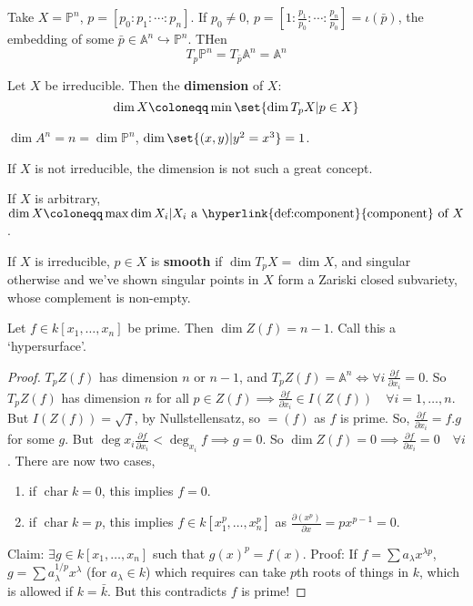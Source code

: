 \documentclass{article}
\newcommand{\A}{\mathbb{A}}
\newcommand{\proj}{\mathbb{P}}
\DeclareMathOperator{\chara}{char}
\begin{document}
\begin{eg}
    Take $X = \proj^n$, $p = [p_0: p_1: \dotsb: p_n]$. If $p_0 \neq 0$, $p = [1: \frac{p_1}{p_0} : \dotsb : \frac{p_n}{p_0}] = \iota(\bar{p})$, the embedding of some $\bar{p} \in \A^n \hookrightarrow \proj^n$. THen
    \begin{equation*}
        T_p \proj^n = T_{\bar{p}} \A^n = \A^n
    \end{equation*}
\end{eg}
\begin{defi}
    Let $X$ be irreducible. Then the \textbf{dimension} of $X$:
    \begin{equation*}
        \dim X \coloneqq \min \set{\dim T_p X | p \in X}
    \end{equation*}
\end{defi}
\begin{eg}
    $\dim A^n = n = \dim \proj^n$, $\dim \set{(x, y) | y^2 = x^3} = 1$.
\end{eg}
If $X$ is not irreducible, the dimension is not such a great concept.
\begin{defi}
    If $X$ is arbitrary, $\dim X \coloneqq \max{\dim X_i | X_i \text{ a \hyperlink{def:component}{component} of } X}$.
\end{defi}
\begin{defi}
    If $X$ is irreducible, $p \in X$ is \textbf{smooth} if $\dim T_p X = \dim X$, and singular otherwise and we've shown singular points in $X$ form a Zariski closed subvariety, whose complement is non-empty. %
\end{defi}
\begin{lemma}
    Let $f \in k[x_1, \dotsc, x_n]$ be prime. Then $\dim Z(f) = n-1$. Call this a `hypersurface'.
\end{lemma}
\begin{proof}
    $T_p Z(f)$ has dimension $n$ or $n-1$, and $T_p Z(f) = \A^n \iff \forall i \, \frac{\partial f}{\partial x_i} = 0$.
    So $T_p Z(f)$ has dimension $n$ for all $p \in Z(f) \implies \frac{\partial f}{\partial x_i} \in I(Z(f)) \quad \forall i=1, \dotsc, n$.
    But $I(Z(f)) = \sqrt{f}$, by Nullstellensatz, so $=(f)$ as $f$ is prime.
    So, $\frac{\partial f}{\partial x_i} = f . g$ for some $g$. But $\deg x_i \frac{\partial f}{\partial x_i} < \deg_{x_i} f \implies g = 0$.
    So $\dim Z(f) = 0 \implies \frac{\partial f}{\partial x_i} = 0 \quad \forall i$.
    There are now two cases,
    \begin{enumerate}[label=(\roman*)]
        \item if $\chara k = 0$, this implies $f = 0$.
        \item if $\chara k = p$, this implies $f \in k[x_1^p, \dotsc, x_n^p]$ as $\frac{\partial (x^p)}{\partial x} = p x^{p-1} = 0$.
    \end{enumerate}
    Claim: $\exists g \in k[x_1, \dotsc, x_n]$ such that $g(x)^p = f(x)$.
    Proof: If $f = \sum a_\lambda x^{\lambda p}$, $g = \sum a_\lambda^{1/p} x^\lambda$ (for $a_\lambda \in k$) which requires can take $p$th roots of things in $k$, which is allowed if $k = \bar{k}$.
    But this contradicts $f$ is prime!
\end{proof}
\end{document}
